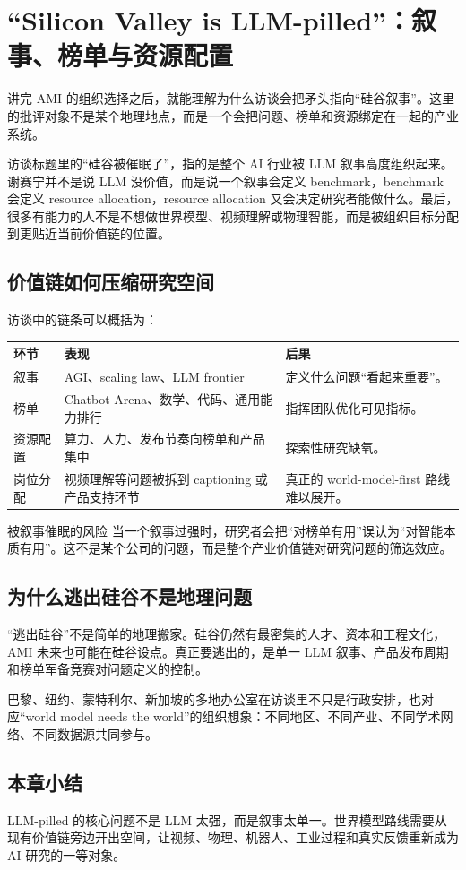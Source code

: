 \section{“Silicon Valley is LLM-pilled”：叙事、榜单与资源配置}

讲完 AMI 的组织选择之后，就能理解为什么访谈会把矛头指向“硅谷叙事”。这里的批评对象不是某个地理地点，而是一个会把问题、榜单和资源绑定在一起的产业系统。

访谈标题里的“硅谷被催眠了”，指的是整个 AI 行业被 LLM 叙事高度组织起来。谢赛宁并不是说 LLM 没价值，而是说一个叙事会定义 benchmark，benchmark 会定义 resource allocation，resource allocation 又会决定研究者能做什么。最后，很多有能力的人不是不想做世界模型、视频理解或物理智能，而是被组织目标分配到更贴近当前价值链的位置。

\subsection{价值链如何压缩研究空间}

访谈中的链条可以概括为：

\begin{center}
\begin{tabularx}{0.95\textwidth}{p{}p{}X}
\toprule
环节 & 表现 & 后果 \\
\midrule
叙事 & AGI、scaling law、LLM frontier & 定义什么问题“看起来重要”。 \\
榜单 & Chatbot Arena、数学、代码、通用能力排行 & 指挥团队优化可见指标。 \\
资源配置 & 算力、人力、发布节奏向榜单和产品集中 & 探索性研究缺氧。 \\
岗位分配 & 视频理解等问题被拆到 captioning 或产品支持环节 & 真正的 world-model-first 路线难以展开。 \\
\bottomrule
\end{tabularx}
\end{center}

\begin{warningbox}{被叙事催眠的风险}
当一个叙事过强时，研究者会把“对榜单有用”误认为“对智能本质有用”。这不是某个公司的问题，而是整个产业价值链对研究问题的筛选效应。
\end{warningbox}

\subsection{为什么逃出硅谷不是地理问题}

“逃出硅谷”不是简单的地理搬家。硅谷仍然有最密集的人才、资本和工程文化，AMI 未来也可能在硅谷设点。真正要逃出的，是单一 LLM 叙事、产品发布周期和榜单军备竞赛对问题定义的控制。

巴黎、纽约、蒙特利尔、新加坡的多地办公室在访谈里不只是行政安排，也对应“world model needs the world”的组织想象：不同地区、不同产业、不同学术网络、不同数据源共同参与。

\subsection{本章小结}

LLM-pilled 的核心问题不是 LLM 太强，而是叙事太单一。世界模型路线需要从现有价值链旁边开出空间，让视频、物理、机器人、工业过程和真实反馈重新成为 AI 研究的一等对象。

